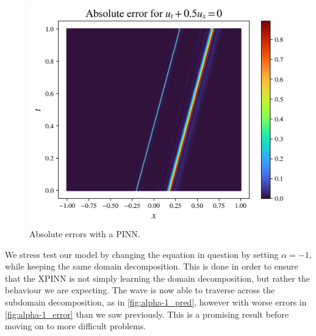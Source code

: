 \begin{figure}[h]
    \centering
    \includegraphics[width=0.8\linewidth]{Project1XPINNs/figures/advection/single_advection_error.png}
    \caption{Absolute errors with a PINN.}
    \label{fig:single_ad_error}
\end{figure}

We stress test our model by changing the equation in question by setting $\alpha=-1$, while keeping the same domain decomposition.
This is done in order to ensure that the XPINN is not simply learning the domain decomposition, but rather the behaviour we are expecting.
The wave is now able to traverse across the subdomain decomposition, as in \autoref{fig:alpha-1_pred}, however with worse errors in \autoref{fig:alpha-1_error} than we saw previously.
This is a promising result before moving on to more difficult problems.

